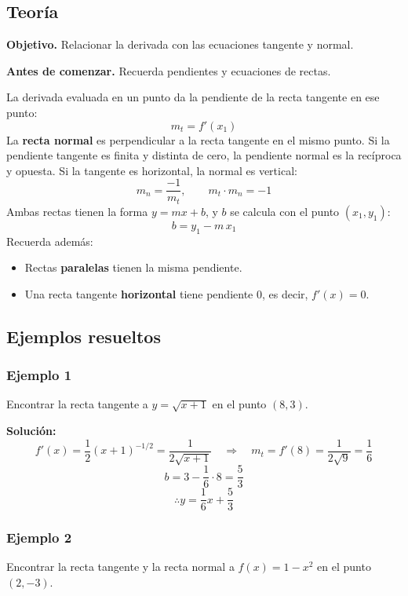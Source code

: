 \documentclass[12pt]{article}
\begin{document}
\subsection{Teoría}

\textbf{Objetivo.} Relacionar la derivada con las ecuaciones tangente y normal.

\textbf{Antes de comenzar.} Recuerda pendientes y ecuaciones de rectas.


La derivada evaluada en un punto da la pendiente de la recta tangente en ese punto:
\[
m_t = f'(x_1)
\]
La \textbf{recta normal} es perpendicular a la recta tangente en el mismo punto. Si la pendiente tangente es finita y distinta de cero, la pendiente normal es la recíproca y opuesta. Si la tangente es horizontal, la normal es vertical:
\[
m_n = \frac{-1}{m_t}, \qquad m_t \cdot m_n = -1
\]
Ambas rectas tienen la forma $y = mx + b$, y $b$ se calcula con el punto $(x_1, y_1)$:
\[
b = y_1 - m\,x_1
\]
Recuerda además:
\begin{itemize}
    \item Rectas \textbf{paralelas} tienen la misma pendiente.
    \item Una recta tangente \textbf{horizontal} tiene pendiente $0$, es decir, $f'(x) = 0$.
\end{itemize}



\subsection{Ejemplos resueltos}

\subsubsection{Ejemplo 1}


Encontrar la recta tangente a $y = \sqrt{x + 1}$ en el punto $(8, 3)$.

\textbf{Solución:}
\[
f'(x) = \frac{1}{2}(x + 1)^{-1/2} = \frac{1}{2\sqrt{x + 1}} \quad \Rightarrow \quad m_t = f'(8) = \frac{1}{2\sqrt{9}} = \frac{1}{6}
\]
\[
b = 3 - \frac{1}{6} \cdot 8 = \frac{5}{3}
\]
\[
\therefore y = \frac{1}{6}x + \frac{5}{3}
\]



\subsubsection{Ejemplo 2}


Encontrar la recta tangente y la recta normal a $f(x) = 1 - x^2$ en el punto $(2, -3)$.
\end{document}

